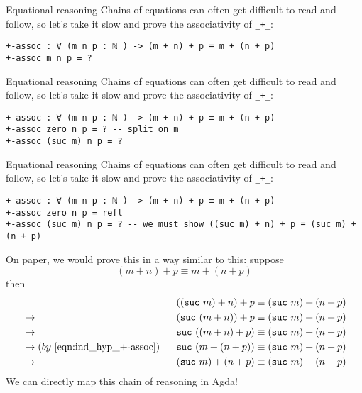\documentclass[t,aspectratio=169,9pt]{beamer}
\begin{document}
\begin{frame}[fragile]{Equational reasoning}
  Chains of equations can often get difficult to read and follow, so let's take
  it slow and prove the associativity of \texttt{_+_}:
\begin{verbatim}
+-assoc : ∀ (m n p : ℕ ) -> (m + n) + p ≡ m + (n + p)
+-assoc m n p = ? 
\end{verbatim}
\end{frame}

\begin{frame}{Equational reasoning}
  Chains of equations can often get difficult to read and follow, so let's take
  it slow and prove the associativity of \texttt{_+_}:
\begin{verbatim}
+-assoc : ∀ (m n p : ℕ ) -> (m + n) + p ≡ m + (n + p)
+-assoc zero n p = ? -- split on m
+-assoc (suc m) n p = ?
\end{verbatim}
\end{frame}

\begin{frame}{Equational reasoning}
  Chains of equations can often get difficult to read and follow, so let's take
  it slow and prove the associativity of \texttt{_+_}:
\begin{verbatim}
+-assoc : ∀ (m n p : ℕ ) -> (m + n) + p ≡ m + (n + p)
+-assoc zero n p = refl 
+-assoc (suc m) n p = ? -- we must show ((suc m) + n) + p ≡ (suc m) + (n + p)
\end{verbatim}
On paper, we would prove this in a way similar to this: 
suppose
\begin{equation}
  \label{eqn:ind_hyp_+-assoc}
  (m + n) + p \equiv m + (n + p)
\end{equation}
then
$$
\begin{aligned}
    & && ((\texttt{suc}~m) + n) + p \equiv (\texttt{suc}~m) + (n + p) \\
    & \rightarrow ~~ && (\texttt{suc}~(m + n)) + p \equiv (\texttt{suc}~m) + (n + p) \\
    & \rightarrow ~~ && \texttt{suc}~((m + n) + p) \equiv (\texttt{suc}~m) + (n + p) \\
    & \rightarrow (by ~ \eqref{eqn:ind_hyp_+-assoc})~~ && \texttt{suc}~(m + (n + p)) \equiv (\texttt{suc}~m) + (n + p) \\
    & \rightarrow ~~ && (\texttt{suc}~m) + (n + p) \equiv (\texttt{suc}~m) + (n + p)
\end{aligned}
$$
We can directly map this chain of reasoning in Agda!
\end{frame}
\end{document}
